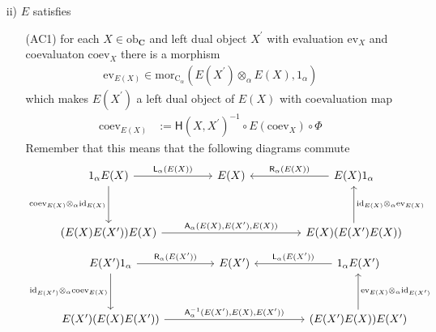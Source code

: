 \begin{thm}
\begin{enumerate}
\item[ii)]
$E$ satisfies
\begin{enumerate}
\item[(AC1)]
for each $X \in \mathrm{ob}_{\mathbf{C}}$ and left dual object $X^{\prime}$ with evaluation $\mathrm{ev}_{X}$ and coevaluaton $\mathrm{coev}_{X}$ there is a morphism
\begin{align*}
  \mathrm{ev}_{E(X)}
  \in
  \mathrm{mor}_{\mathrm{C}_{\alpha}}
  \left(
    E(X^{\prime})
    \otimes_{\alpha}
    E(X)
    ,
    1_{\alpha}
  \right)
\end{align*}
which makes $E(X^{\prime})$ a left dual object of $E(X)$ with coevaluation map
\begin{align*}
  \mathrm{coev}_{E(X)}
  &:=
  \mathsf{H}(X,X^{\prime})^{-1}
  \circ
  E(\mathrm{coev}_{X})
  \circ
  \Phi
\end{align*}
Remember that this means that the following diagrams commute
\begin{equation*}
\begin{tikzcd}[row sep=3.3em,column sep=4.5em]
  1_{\alpha} E(X)
  \ar{r}{\mathsf{L}_{\alpha}(E(X))}
  \ar{d}[swap]{\mathrm{coev}_{E(X)} \otimes_{\alpha} \mathrm{id}_{E(X)}}
  &
  E(X)
  &
  E(X) 1_{\alpha}
  \ar{l}[swap]{\mathsf{R}_{\alpha}(E(X))}
  \\
  (E(X) E(X^{\prime})) E(X)
  \ar{rr}{\mathsf{A}_{\alpha}(E(X),E(X^{\prime}),E(X))}
  &
  &
  E(X) (E(X^{\prime}) E(X))
  \ar{u}[swap]{\mathrm{id}_{E(X)} \otimes_{\alpha} \mathrm{ev}_{E(X)}}
\end{tikzcd}
\end{equation*}
\begin{equation*}
\begin{tikzcd}[row sep=3.3em,column sep=4.5em]
  E(X^{\prime}) 1_{\alpha}
  \ar{r}{\mathsf{R}_{\alpha}(E(X^{\prime}))}
  \ar{d}[swap]{\mathrm{id}_{E(X^{\prime})} \otimes_{\alpha} \mathrm{coev}_{E(X)}}
  &
  E(X^{\prime})
  &
  1_{\alpha} E(X^{\prime})
  \ar{l}[swap]{\mathsf{L}_{\alpha}(E(X^{\prime}))}
  \\
  E(X^{\prime}) (E(X) E(X^{\prime}))
  \ar{rr}{\mathsf{A}_{\alpha}^{-1}(E(X^{\prime}),E(X),E(X^{\prime}))}
  &
  &
  (E(X^{\prime}) E(X)) E(X^{\prime})
  \ar{u}[swap]{\mathrm{ev}_{E(X)} \otimes_{\alpha} \mathrm{id}_{E(X^{\prime})}}
\end{tikzcd}
\end{equation*}


\end{enumerate}
\end{enumerate}
\end{thm}
